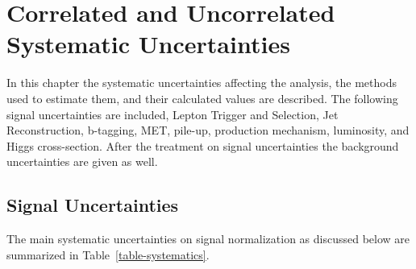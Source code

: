 

\chapter{Correlated and Uncorrelated Systematic Uncertainties}
\label{sec:systematics}


In this chapter the systematic uncertainties affecting the analysis, the methods used to estimate them, and their calculated values are described. The following signal uncertainties are included, Lepton Trigger and Selection, Jet Reconstruction, b-tagging, MET, pile-up, production mechanism, luminosity, and Higgs cross-section.  After the treatment on signal uncertainties the background uncertainties are given as well.




\section{Signal Uncertainties}
The main systematic uncertainties on signal normalization as discussed below are summarized in Table~\ref{table-systematics}.

